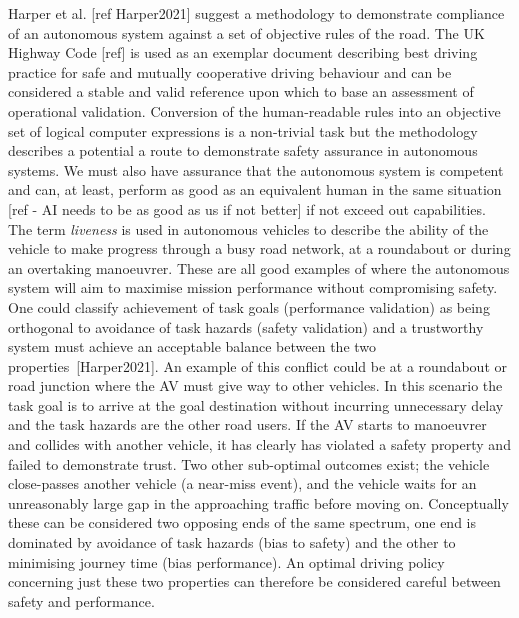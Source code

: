 \documentclass[sigconf]{acmart}
\begin{document}
Harper et al. [ref Harper2021] suggest a methodology to demonstrate compliance of an autonomous system against a set of objective rules of the road. The UK Highway Code [ref] is used as an exemplar document describing best driving practice for safe and mutually cooperative driving behaviour and can be considered a stable and valid reference upon which to base an assessment of operational validation. Conversion of the human-readable rules into an objective set of logical computer expressions is a non-trivial task but the methodology describes a potential a route to demonstrate safety assurance in autonomous systems. 
%
We must also have assurance that the autonomous system is competent and can, at least, perform as good as an equivalent human in the same situation [ref - AI needs to be as good as us if not better] if not exceed out capabilities. 
%
The term \emph{liveness} is used in autonomous vehicles to describe the ability of the vehicle to make progress through a busy road network, at a roundabout or during an overtaking manoeuvrer. These are all good examples of where the autonomous system will aim to maximise mission performance without compromising safety. One could classify achievement of task goals (performance validation) as being orthogonal to avoidance of task hazards (safety validation) and a trustworthy system must achieve an acceptable balance between the two properties~[Harper2021]. 
%
An example of this conflict could be at a roundabout or road junction where the AV must give way to other vehicles. In this scenario the task goal is to arrive at the goal destination without incurring unnecessary delay and the task hazards are the other road users. If the AV starts to manoeuvrer and collides with another vehicle, it has clearly has violated a safety property and failed to demonstrate trust. 
%
Two other sub-optimal outcomes exist; the vehicle close-passes another vehicle (a near-miss event), and the vehicle waits for an unreasonably large gap in the approaching traffic before moving on. Conceptually these can be considered two opposing ends of the same spectrum, one end is dominated by avoidance of task hazards (bias to safety) and the other to minimising journey time (bias performance). 
%
An optimal driving policy concerning just these two properties can therefore be considered careful between safety and performance.
\\
\end{document}

